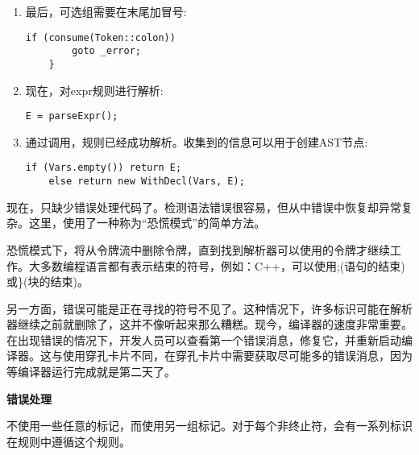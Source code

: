 \begin{enumerate}
\item 最后，可选组需要在末尾加冒号:
\begin{lstlisting}[caption={}]
	if (consume(Token::colon))
		goto _error;
	}
\end{lstlisting}

\item 现在，对expr规则进行解析:
\begin{lstlisting}[caption={}]
	E = parseExpr();
\end{lstlisting}

\item 通过调用，规则已经成功解析。收集到的信息可以用于创建AST节点:
\begin{lstlisting}[caption={}]
	if (Vars.empty()) return E;
	else return new WithDecl(Vars, E);
\end{lstlisting}
\end{enumerate}

现在，只缺少错误处理代码了。检测语法错误很容易，但从中错误中恢复却异常复杂。这里，使用了一种称为“恐慌模式”的简单方法。\par

恐慌模式下，将从令牌流中删除令牌，直到找到解析器可以使用的令牌才继续工作。大多数编程语言都有表示结束的符号，例如：C++，可以使用;(语句的结束)或\}(块的结束)。\par

另一方面，错误可能是正在寻找的符号不见了。这种情况下，许多标识可能在解析器继续之前就删除了，这并不像听起来那么糟糕。现今，编译器的速度非常重要。在出现错误的情况下，开发人员可以查看第一个错误消息，修复它，并重新启动编译器。这与使用穿孔卡片不同，在穿孔卡片中需要获取尽可能多的错误消息，因为等编译器运行完成就是第二天了。\par

\hspace*{\fill} \par %
\textbf{错误处理}

不使用一些任意的标记，而使用另一组标记。对于每个非终止符，会有一系列标识在规则中遵循这个规则。\par

